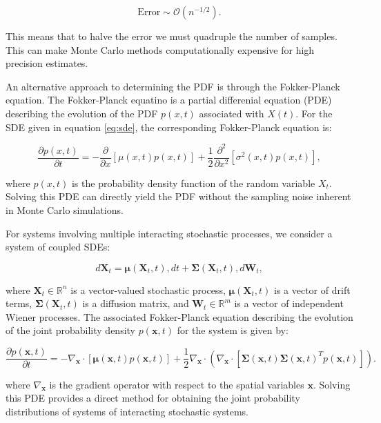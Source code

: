 \begin{equation*} 
    \text{Error} \sim \mathcal{O}(n^{-1/2}). 
\end{equation*}


This means that to halve the error we must quadruple the number of samples. This can make Monte Carlo methods
computationally expensive for high precision estimates. 

An alternative approach to determining the PDF is through the Fokker-Planck equation.
The Fokker-Planck equatino is a partial differenial equation (PDE) describing the evolution of the PDF $p(x, t)$ 
associated with $X(t)$. For the SDE given in equation \eqref{eq:sde}, the corresponding Fokker-Planck equation is:

\begin{equation}
    \frac{\partial p(x,t)}{\partial t} = -\frac{\partial}{\partial x}\left[ \mu(x,t) p(x,t) \right] + \frac{1}{2}\frac{\partial^2}{\partial x^2}\left[ \sigma^2(x,t) p(x,t) \right],
\end{equation}

where $p(x,t)$ is the probability density function of the random variable $X_t$. 
Solving this PDE can directly yield the PDF without the sampling noise inherent in Monte Carlo simulations.

For systems involving multiple interacting stochastic processes, we consider a system of coupled SDEs:

\begin{equation}
    d\mathbf{X}_t = \boldsymbol{\mu}(\mathbf{X}_t, t),dt + \boldsymbol{\Sigma}(\mathbf{X}_t, t), d\mathbf{W}_t,
\end{equation}

where $\mathbf{X}_t \in \mathbb{R}^n$ is a vector-valued stochastic process, $\boldsymbol{\mu}(\mathbf{X}_t, t)$ 
is a vector of drift terms, $\boldsymbol{\Sigma}(\mathbf{X}_t, t)$ is a diffusion matrix, and 
$\mathbf{W}_t \in \mathbb{R}^m$ is a vector of independent Wiener processes. The associated Fokker-Planck
equation describing the evolution of the joint probability density $p(\mathbf{x}, t)$ for the system is given by:

\begin{equation}
    \frac{\partial p(\mathbf{x}, t)}{\partial t} = -\nabla_{\mathbf{x}} \cdot \left[ \boldsymbol{\mu}(\mathbf{x}, t) p(\mathbf{x}, t) \right] 
    + \frac{1}{2} \nabla_{\mathbf{x}} \cdot \left( \nabla_{\mathbf{x}} \cdot \left[ \boldsymbol{\Sigma}(\mathbf{x}, t) \boldsymbol{\Sigma}(\mathbf{x}, t)^T p(\mathbf{x}, t) \right] \right).
\end{equation}

where $\nabla_{\mathbf{x}}$ is the gradient operator with respect to the spatial variables $\mathbf{x}$.
Solving this PDE provides a direct method for obtaining the joint probability distributions of systems of 
interacting stochastic systems.